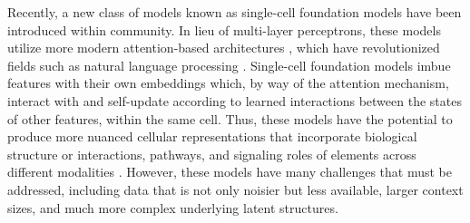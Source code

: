 Recently, a new class of models known as single-cell foundation models have been introduced within community.
In lieu of multi-layer perceptrons, these models \cite{} utilize more modern attention-based architectures \cite{}, which have revolutionized fields such as natural language processing \cite{}.
Single-cell foundation models imbue features with their own embeddings which, by way of the attention mechanism, interact with and self-update according to learned interactions between the states of other features, within the same cell.
Thus, these models have the potential to produce more nuanced cellular representations that incorporate biological structure \cite{stark2021,roohani2023}
or interactions, pathways, and signaling roles of elements across different modalities \cite{argelaguet2018, immer2024,}.
However, these models have many challenges that must be addressed, including  data that is not only noisier but less available, larger context sizes, and much more complex underlying latent structures.

  

